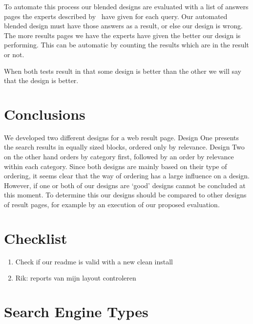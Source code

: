 \documentclass[12pt]{article}
\begin{document}
To automate this process our blended designs are evaluated with a list of answers pages the experts described by~\cite{lalmas2011aggregated} have given for each query. Our automated blended design must have those answers as a result, or else our design is wrong. The more results pages we have the experts have given the better our design is performing. This can be automatic by counting the results which are in the result or not. 

When both tests result in that some design is better than the other we will say that the design is better. %

\section{Conclusions}
\label{sec:conclusion}
We developed two different designs for a web result page.
Design One presents the search results in equally sized blocks, ordered only by relevance.
Design Two on the other hand orders by category first, followed by an order by relevance within each category.
Since both designs are mainly based on their type of ordering, it seems clear that the way of ordering has a large influence on a design.
However, if one or both of our designs are `good' designs cannot be concluded at this moment.
To determine this our designs should be compared to other designs of result pages, for example by an execution of our proposed evaluation.

\section{Checklist}
\begin{enumerate}
\item Check if our readme is valid with a new clean install
\item Rik: reports van mijn layout controleren
\end{enumerate}




\appendix
\section{Search Engine Types}
\label{app:enginetypes}

\end{document}
